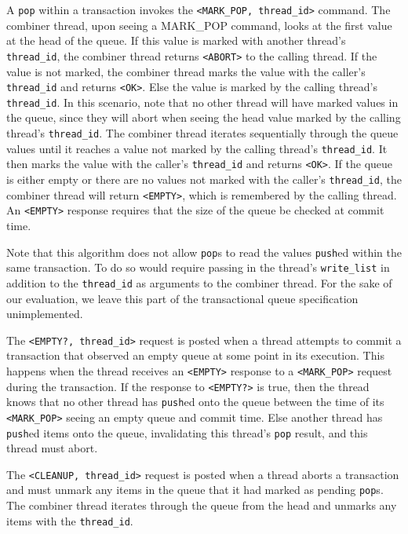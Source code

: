 A \texttt{pop} within a transaction invokes the \texttt{<MARK\_POP, thread\_id>} command. The combiner thread, upon seeing a MARK\_POP command, looks at the first value at the head of the queue. If this value is marked with another thread’s \texttt{thread\_id}, the combiner thread returns \texttt{<ABORT>} to the calling thread. If the value is not marked, the combiner thread marks the value with the caller’s \texttt{thread\_id} and returns \texttt{<OK>}. Else the value is marked by the calling thread’s \texttt{thread\_id}. In this scenario, note that no other thread will have marked values in the queue, since they will abort when seeing the head value marked by the calling thread’s \texttt{thread\_id}. The combiner thread iterates sequentially through the queue values until it reaches a value not marked by the calling thread’s \texttt{thread\_id}. It then marks the value with the caller’s \texttt{thread\_id} and returns \texttt{<OK>}. If the queue is either empty or there are no values not marked with the caller’s \texttt{thread\_id}, the combiner thread will return \texttt{<EMPTY>}, which is remembered by the calling thread. An \texttt{<EMPTY>} response requires that the size of the queue be checked at commit time.

Note that this algorithm does not allow \texttt{pop}s to read the values \texttt{push}ed within the same transaction. To do so would require passing in the thread’s \texttt{write\_list} in addition to the \texttt{thread\_id} as arguments to the combiner thread. For the sake of our evaluation, we leave this part of the transactional queue specification unimplemented.

The \texttt{<EMPTY?, thread\_id>} request is posted when a thread attempts to commit a transaction that observed an empty queue at some point in its execution. This happens when the thread receives an \texttt{<EMPTY>} response to a \texttt{<MARK\_POP>} request during the transaction. If the response to \texttt{<EMPTY?>} is true, then the thread knows that no other thread has \texttt{push}ed onto the queue between the time of its \texttt{<MARK\_POP>} seeing an empty queue and commit time. Else another thread has \texttt{push}ed items onto the queue, invalidating this thread’s \texttt{pop} result, and this thread must abort.

The \texttt{<CLEANUP, thread\_id>} request is posted when a thread aborts a transaction and must unmark any items in the queue that it had marked as pending \texttt{pop}s. The combiner thread iterates through the queue from the head and unmarks any items with the \texttt{thread\_id}.

